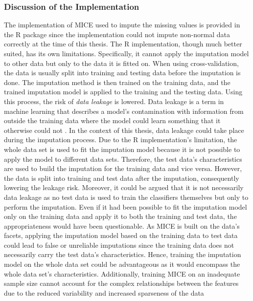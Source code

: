 \subsubsection{Discussion of the Implementation}
The implementation of MICE used to impute the missing values is provided in the 
R package  since the  implementation could not 
impute non-normal data correctly at the time of this thesis. The R 
implementation, though much better suited, has its own limitations. 
Specifically, it cannot apply the imputation model to other data but only to 
the data it is fitted on. 
When using cross-validation, the data is usually split into 
training and testing data before the imputation is done. The imputation method 
is then trained on the training data, and the trained imputation model is 
applied to the training and the testing data. Using this process, the 
risk of \textit{data leakage} is lowered.
Data leakage is a term in machine learning 
that describes a model's contamination with information from outside the 
training data where the model could learn something that it otherwise could not 
\cite{RN199}.
In the context of this thesis, data leakage could take place during the 
imputation process. Due to the R implementation's limitation, the whole 
data set is used to fit the imputation model because it is not possible to 
apply the model to different data sets. Therefore, the test data's 
characteristics 
are used to build the imputation for the training data and vice 
versa. However, the data is split into training and test data after the 
imputation, consequently lowering the leakage risk. Moreover, it could be 
argued that it is not necessarily data leakage as no test data is used to train 
the classifiers themselves but only to perform the imputation.
Even if it had been possible to fit the imputation model only on the training 
data and apply it to both the training and test data, the appropriateness would 
have been questionable. As MICE is built on the data's facets, applying 
the imputation model based on the training data to test data could lead to 
false or unreliable imputations since the training data does not necessarily 
carry the test data's characteristics. Hence, training the imputation 
model on the whole data set could be advantageous as it would encompass the 
whole data set's characteristics. Additionally, training MICE on an inadequate 
sample size cannot account for the complex relationships between the 
features due to the reduced variability and increased sparseness of the data 
